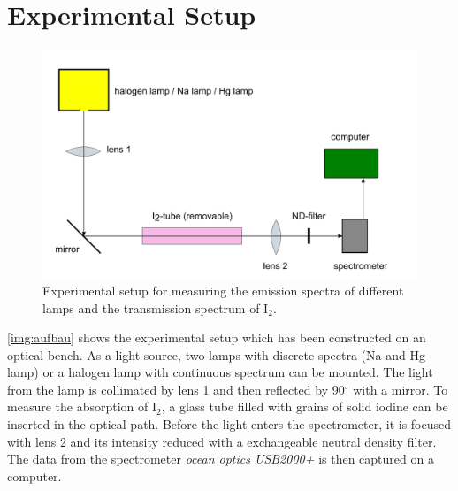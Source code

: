 \section{Experimental Setup}

\begin{figure}[H]
\begin{center}
  \includegraphics[width=\textwidth]{../img/aufbau.pdf}
  \caption[---]{Experimental setup for measuring the emission spectra of different lamps and
  the transmission spectrum of I$_2$.}
  \label{img:aufbau}
\end{center}
\end{figure}

\autoref{img:aufbau} shows the experimental setup which has been constructed on an optical bench.
As a light source, two lamps with discrete spectra (Na and Hg lamp) or a
halogen lamp with continuous spectrum can be mounted.
The light from the lamp is collimated by lens 1 and then reflected by 90$^{\circ}$ with a mirror.
To measure the absorption of I$_2$, a glass tube filled with grains of solid iodine can be inserted in the
optical path.
Before the light enters the spectrometer, it is focused with lens 2 and its intensity
reduced with a exchangeable neutral density filter.
The data from the spectrometer \emph{ocean optics USB2000+} is then captured on a computer.
